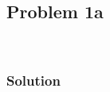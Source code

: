 \documentclass[conf]{new-aiaa}
\begin{document}
%
%


\newpage

\subsection*{Problem 1a} 

\begin{center}
	 \\
\end{center}


\subsubsection*{Solution} 
\end{document}
